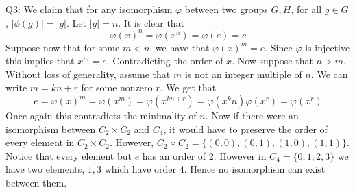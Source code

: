 \documentclass[letterpaper]{article}
\begin{document}
\noindent Q3: We claim that for any isomorphism $\varphi$ between two groups $G,H$, for all $g\in G$, $|\phi(g)| = |g|$. Let $|g|=n$. It is clear that $$\varphi(x)^n=\varphi(x^n) = \varphi(e) =e$$ Suppose now that for some $m<n$, we have that $\varphi(x)^m =e$. Since $\varphi$ is injective this implies that $x^m = e$. Contradicting the order of $x$. Now suppose that $n>m$. Without loss of generality, assume that $m$ is not an integer multiple of $n$. We can write $m = kn+r$ for some nonzero $r$. We get that $$e = \varphi(x)^{m} = \varphi(x^{m}) = \varphi(x^{kn+r}) = \varphi(x^kn)\varphi(x^r) = \varphi(x^r)$$
Once again this contradicts the minimality of $n$. Now if there were an isomorphism between $C_2\times C_2$ and $C_4$, it would have to preserve the order of every element in $C_2\times C_2$. However, $C_2\times C_2 = \{(0,0),(0,1),(1,0),(1,1)\}$. Notice that every element but $e$ has an order of 2. However in $C_4 = \{0,1,2,3\}$ we have two elements, $1,3$ which have order 4. Hence no isomorphism can exist between them. 
\end{document}

